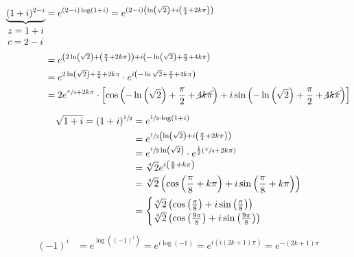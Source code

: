 \documentclass[12pt,a4paper,notitlepage,fleqn]{article}
\begin{document}
    \begin{align*}
    \underbrace{(1+i)^{2-i}}_{\mathclap{\begin{array}{l}
    		z=1+i\\ c=2-i
    		\end{array}}} &= e^{(2-i)\log(1+i)}
    = e^{(2-i)\left( \ln\left(\sqrt{2}\right)+i\left(
    	\frac{\pi}{4}+2k\pi
    	\right) \right)}
    \\ &= e^{
       	\left(
       	2\ln\left(\sqrt{2}\right)+\left(\frac{\pi}{4}+2k\pi\right)
       	\right)+i\left(
       	-\ln\left(\sqrt{2}\right)+\frac{\pi}{2}+4k\pi
       	\right)
    }
    \\ &= e^{2\ln\left(\sqrt{2}\right)+\frac{\pi}{4}+2k\pi} \cdot
    e^{i\left(
       	-\ln\sqrt{2}+\frac{\pi}{2}+4k\pi
       	\right)}
    \\ &= 2e^{\sfrac{\pi}{4}+2k\pi}\cdot\left[
    \cos\left(
    -\ln\left(\sqrt{2}\right)+\frac{\pi}{2}+\cancel{4k\pi}
    \right)+i\sin\left(
    -\ln\left(\sqrt{2}\right)+\frac{\pi}{2}+\cancel{4k\pi}
    \right)
    \right]
    \end{align*}

    \begin{align*}
    \sqrt{1+i} = (1+i)^{\sfrac{1}{2}} &= e^{\sfrac{1}{2}\cdot\log(1+i)} \\
    &= e^{\sfrac{1}{2}\left( \ln\left(\sqrt{2}\right)
    	+i\left( \frac{\pi}{4}+2k\pi \right)
    	 \right)}
    \\ &= e^{\sfrac{1}{2}\ln\left(\sqrt{2}\right)}\cdot e^{
    	\frac{1}{2}\left( \sfrac{\pi}{4}+2k\pi \right)
    	}
    \\ &= \sqrt[4]{2}e^{i\left( \frac{\pi}{8}+k\pi \right)}
    \\ &= \sqrt[4]{2}\left( \cos\left( \frac{\pi}{8}+k\pi \right)
    +i\sin\left( \frac{\pi}{8}+k\pi \right)\right)
    \\ &= \begin{cases}
    \sqrt[4]{2} \left( \cos\left( \frac{\pi}{8} \right)
    +i\sin\left( \frac{\pi}{8} \right)\right) \\
    \sqrt[4]{2} \left( \cos\left( \frac{9\pi}{8} \right)
    +i\sin\left( \frac{9\pi}{8} \right)\right)
    \end{cases}
    \end{align*}
    \begin{align*}
    (-1)^i &= e^{\log\left( (-1)^i \right)}
    =e^{i\log(-1)} = e^{
    	i\left( i(2k+1)\pi \right)
    	} = e^{-(2k+1)\pi}
    \end{align*}
\end{document}
